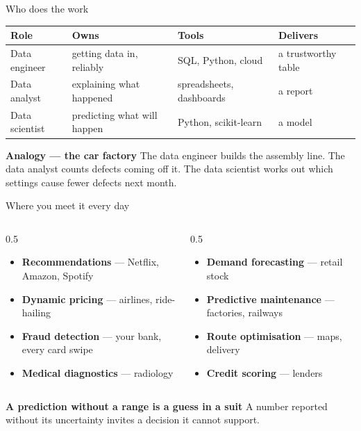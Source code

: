 \documentclass[10pt,aspectratio=169]{beamer}
\newcommand{\trapbox}[2]{%
  \begin{alertblock}{\textbf{#1}}
  #2
  \end{alertblock}%
}
\newcommand{\analogybox}[2]{%
  \begin{exampleblock}{\textbf{Analogy --- #1}}
  #2
  \end{exampleblock}%
}
\begin{document}
\begin{frame}{Who does the work}
\begin{table}
\small
\begin{tabularx}{\linewidth}{@{}lXXX@{}}
\toprule
\textbf{Role} & \textbf{Owns} & \textbf{Tools} & \textbf{Delivers} \\
\midrule
Data engineer & getting data in, reliably & SQL, Python, cloud & a trustworthy table \\
Data analyst & explaining what happened & spreadsheets, dashboards & a report \\
Data scientist & predicting what will happen & Python, scikit-learn & a model \\
\bottomrule
\end{tabularx}
\end{table}
\analogybox{the car factory}{The data engineer builds the assembly line. The data analyst counts defects coming off it. The data scientist works out which settings cause fewer defects next month.}
\end{frame}

\begin{frame}{Where you meet it every day}
\begin{columns}[T]
\begin{column}{0.5\textwidth}
\begin{itemize}\small
\item \textbf{Recommendations} --- Netflix, Amazon, Spotify
\item \textbf{Dynamic pricing} --- airlines, ride-hailing
\item \textbf{Fraud detection} --- your bank, every card swipe
\item \textbf{Medical diagnostics} --- radiology
\end{itemize}
\end{column}
\begin{column}{0.5\textwidth}
\begin{itemize}\small
\item \textbf{Demand forecasting} --- retail stock
\item \textbf{Predictive maintenance} --- factories, railways
\item \textbf{Route optimisation} --- maps, delivery
\item \textbf{Credit scoring} --- lenders
\end{itemize}
\end{column}
\end{columns}
\vspace{0.4cm}
\trapbox{A prediction without a range is a guess in a suit}{A number reported without its uncertainty invites a decision it cannot support.}
\end{frame}
\end{document}
